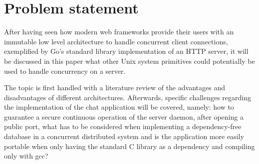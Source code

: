 \section{Problem statement}
After having seen how modern web frameworks provide their users with an immutable low level architecture to handle concurrent client connections, exemplified by Go's standard library implementation of an HTTP server, it will be discussed in this paper what other Unix system primitives could potentially be used to handle concurrency on a server.

The topic is first handled with a literature review of the advantages and disadvantages of different architectures. Afterwards, specific challenges regarding the implementation of the chat application will be covered, namely: how to guarantee a secure continuous operation of the server daemon, after opening a public port, what has to be considered when implementing a dependency-free database in a concurrent distributed system and is the application more easily portable when only having the standard C library as a dependency and compiling only with gcc?